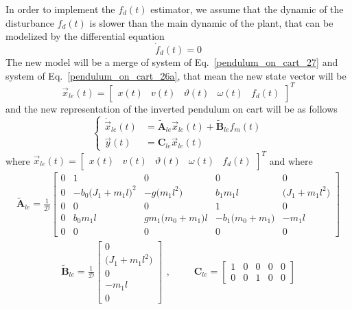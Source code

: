 \documentclass[11pt,a4paper,oneside]{book}
\numberwithin{equation}{section}
\theoremstyle{it}
\theoremstyle{definition}
\begin{document}
In order to implement the $f_d(t)$ estimator, we assume that the dynamic of the disturbance $f_d(t)$ is slower than the main dynamic of the plant, that can be modelized by the differential equation
\begin{equation}\label{pendulum_on_cart_26a}
	\dot{f}_d(t)=0
\end{equation}
The new model will be a merge of system of Eq.~\eqref{pendulum_on_cart_27} and system of Eq.~\eqref{pendulum_on_cart_26a}, that mean the new state vector will be
\begin{equation}\label{pendulum_on_cart_26b}
	\vec{x}_{le}(t)=\begin{bmatrix} x(t)&v(t)&\vartheta(t)&\omega(t)&f_d(t) \end{bmatrix}^T
\end{equation}
and the new representation of the inverted pendulum on cart will be as follows
\begin{equation}\label{pendulum_on_cart_26}
	\left\lbrace 	\begin{aligned}
		\dot{\vec{x}}_{le}(t)&=\tilde{\mathbf{A}}_{le}\vec{x}_{le}(t)+ 
		\tilde{\mathbf{B}}_{le}f_m(t) \\[6pt]
		\vec{y}(t)&=\mathbf{C}_{le}\vec{x}_{le}(t)
	\end{aligned}\right. 
\end{equation}
where $\vec{x}_{le}(t)=\begin{bmatrix}
	x(t)&v(t)&\vartheta(t)&\omega(t)&f_d(t)
\end{bmatrix}^T$ and where
\begin{equation}\label{pendulum_on_cart_27}
	\begin{aligned}
		\tilde{\mathbf{A}}_{le}=\frac{1}{\mathcal{D}}\begin{bmatrix}
			0&1&0&0&0 \\[8pt]		
			0&-b_0\big(J_1+m_1l\big)^2&-g\big(m_1l^2\big)&b_1m_1l&\big(J_1+m_1l^2\big) \\[8pt]
			0&0&0&1&0 \\[8pt]
			0&b_0m_1l&gm_1\big(m_0+m_1\big)l&-b_1\big(m_0+m_1\big)& -m_1l \\[8pt]
			0&0&0&0&0
		\end{bmatrix}
	\end{aligned}
\end{equation}
\begin{equation}\label{pendulum_on_cart_28}
	\begin{aligned}
		\tilde{\mathbf{B}}_{le}=\frac{1}{\mathcal{D}}\begin{bmatrix}
			0 \\[8pt]		
			\big(J_1+m_1l^2\big) \\[8pt]
			0 \\[8pt]
			-m_1l \\[8pt]
			0
		\end{bmatrix}
	\end{aligned},\qquad
	\begin{aligned}
		{\mathbf{C}_{le}}=\begin{bmatrix}
			1&0&0&0&0 \\[8pt]		
			0&0&1&0&0
		\end{bmatrix}
	\end{aligned}
\end{equation}
\end{document}
